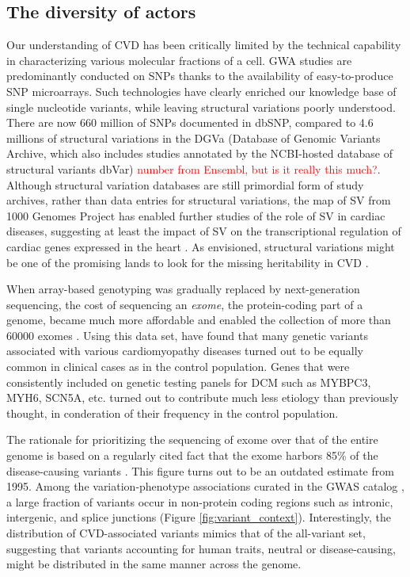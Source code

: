 \documentclass[letter]{bioinfo}
\newcommand{\comment}[1]{\textcolor{red}{#1}}
\begin{document}
\subsection{The diversity of actors}

Our understanding of CVD has been critically limited by the technical capability in characterizing various molecular fractions of a cell. GWA studies are predominantly conducted on SNPs thanks to the availability of easy-to-produce SNP microarrays. Such technologies have clearly enriched our knowledge base of single nucleotide variants, while leaving structural variations poorly understood. There are now 660 million of SNPs documented in dbSNP, compared to 4.6 millions of structural variations in the DGVa (Database of Genomic Variants Archive, which also includes studies annotated by the NCBI-hosted database of structural variants dbVar) \comment{number from Ensembl, but is it really this much?}. Although structural variation databases are still primordial form of study archives, rather than data entries for structural variations, the map of SV from 1000 Genomes Project \citep{Sudmant:2015:integrated} has enabled further studies of the role of SV in cardiac diseases, suggesting at least the impact of SV on the transcriptional regulation of cardiac genes expressed in the heart \citep{Haas:2018:Genomic}. As envisioned, structural variations might be one of the promising lands to look for the missing heritability in CVD \citep{Eichler:2010:Missing}.


When array-based genotyping was gradually replaced by next-generation sequencing, the cost of sequencing an \textit{exome}, the protein-coding part of a genome, became much more affordable and enabled the collection of more than 60000 exomes \citep{Lek:2016:Analysis}. Using this data set, \cite{Walsh:2017:Reassessment} have found that many genetic variants associated with various cardiomyopathy diseases turned out to be equally common in clinical cases as in the control population. Genes that were consistently included on genetic testing panels for DCM such as MYBPC3, MYH6, SCN5A, etc. turned out to contribute much less etiology than previously thought, in conderation of their frequency in the control population.

The rationale for prioritizing the sequencing of exome over that of the entire genome is based on a regularly cited fact that the exome harbors 85\% of the disease-causing variants \citep{Antonarakis:2001:nature}. This figure turns out to be an outdated estimate from 1995. Among the variation-phenotype associations curated in the GWAS catalog \citep{MacArthur:2017:new}, a large fraction of variants occur in non-protein coding regions such as intronic, intergenic, and splice junctions (Figure \ref{fig:variant_context}). Interestingly, the distribution of CVD-associated variants mimics that of the all-variant set, suggesting that variants accounting for human traits, neutral or disease-causing, might be distributed in the same manner across the genome.
\end{document}
